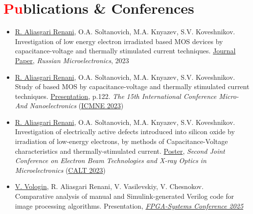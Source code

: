 \documentclass[a4paper,11pt]{article}
\newcommand{\resumesection}[2]{\section{\textcolor{red}{#1}#2}}
\newcommand{\resumeSubHeadingListStart}{\begin{itemize}[leftmargin=0.0in, label={}, itemsep=2pt]}
\newcommand{\resumeSubHeadingListEnd}{\end{itemize}}
\begin{document}
\resumesection{Pu}{blications \& Conferences}
\resumeSubHeadingListStart
    \item \underline{R. Aliasgari Renani}, O.A. Soltanovich, M.A. Knyazev, S.V. Koveshnikov. \\ Investigation of low energy electron irradiated  based MOS devices by capacitance-voltage and thermally stimulated current techniques. \href{https://doi.org/10.1134/S1063739723600516}{Journal Paper}, \textit{Russian Microelectronics}, 2023
    \vspace{2pt}
    \item \underline{R. Aliasgari Renani}, O.A. Soltanovich, M.A. Knyazev, S.V. Koveshnikov. \\ Study of  based MOS by capacitance-voltage and thermally stimulated current techniques. \href{https://icmne.ftian.ru/wp-content/uploads/icmne-2023_e-version.pdf}{Presentation}, p.122. \textit{The 15th International Conference Micro- And Nanoelectronics} (\href{https://icmne.ftian.ru}{ICMNE 2023})
    \vspace{2pt}
    \item \underline{R. Aliasgari Renani}, O.A. Soltanovich, M.A. Knyazev, S.V. Koveshnikov. \\ Investigation of electrically active defects introduced into silicon oxide by irradiation of low-energy electrons, by methods of Capacitance-Voltage characteristics and thermally-stimulated current. \href{https://cebt23.iptm.ru/download/numbered/91.pdf}{Poster}, \textit{Second Joint Conference on Electron Beam Technologies and X-ray Optics in Microelectronics} (\href{https://cebt23.iptm.ru}{CALT 2023})
    \vspace{2pt}
    \item \underline{V. Vologin}, R. Aliasgari Renani, V. Vasilevskiy, V. Chesnokov. \\ Comparative analysis of manual and Simulink-generated Verilog code for image processing algorithms. Presentation, \textit{\href{https://meetups.yadro.com/fpga-msk-1125/}{FPGA-Systems Conference 2025}}
\resumeSubHeadingListEnd
\end{document}

